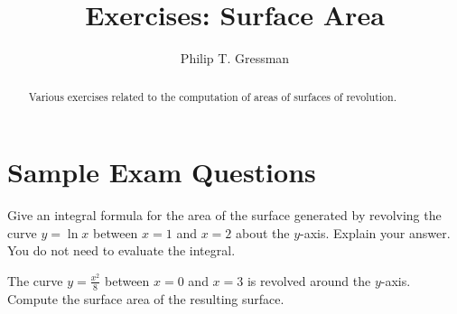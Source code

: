 \documentclass{ximera}
\title{Exercises: Surface Area}
\author{Philip T. Gressman}
\begin{document}
\begin{abstract}
Various exercises related to the computation of areas of surfaces of revolution.
\end{abstract}
\maketitle


\section*{Sample Exam Questions}

\begin{question}
Give an integral formula for the area of the surface generated by revolving the curve $y = \ln x$ between $x=1$ and $x=2$ about the $y$-axis. Explain your answer. You do not need to evaluate the integral. 
\begin{multipleChoice}
 \choicebreak
{}
\end{multipleChoice}
\end{question}

\begin{question}
 The curve $y = \frac{x^2}{8}$ between $x=0$ and $x = 3$ is revolved around the $y$-axis. Compute the surface area of the resulting surface.
\begin{multipleChoice}
\end{multipleChoice}
\end{question}
\end{document}
